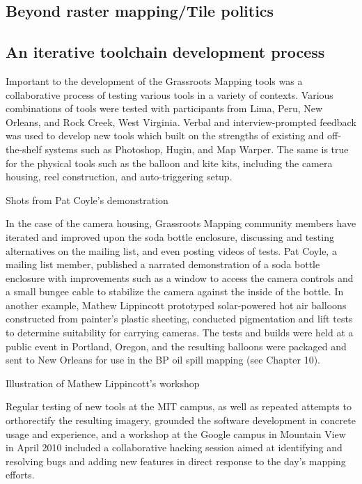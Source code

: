 \documentclass[11pt]{report}
\begin{document}
\subsection{Beyond raster mapping/Tile politics}


\subsection{An iterative toolchain development process}

Important to the development of the Grassroots Mapping tools was a collaborative process of testing various tools in a variety of contexts. Various combinations of tools were tested with participants from Lima, Peru, New Orleans, and Rock Creek, West Virginia. Verbal and interview-prompted feedback was used to develop new tools which built on the strengths of existing and off-the-shelf systems such as Photoshop, Hugin, and Map Warper. The same is true for the physical tools such as the balloon and kite kits, including the camera housing, reel construction, and auto-triggering setup. 

Shots from Pat Coyle's demonstration

In the case of the camera housing, Grassroots Mapping community members have iterated and improved upon the soda bottle enclosure, discussing and testing alternatives on the mailing list, and even posting videos of tests. Pat Coyle, a mailing list member, published a narrated demonstration of a soda bottle enclosure with improvements such as a window to access the camera controls and a small bungee cable to stabilize the camera against the inside of the bottle. In another example, Mathew Lippincott prototyped solar-powered hot air balloons constructed from painter's plastic sheeting, conducted pigmentation and lift tests to determine suitability for carrying cameras. The tests and builds were held at a public event in Portland, Oregon, and the resulting balloons were packaged and sent to New Orleans for use in the BP oil spill mapping (see Chapter 10). 

Illustration of Mathew Lippincott's workshop 

Regular testing of new tools at the MIT campus, as well as repeated attempts to orthorectify the resulting imagery, grounded the software development in concrete usage and experience, and a workshop at the Google campus in Mountain View in April 2010 included a collaborative hacking session aimed at identifying and resolving bugs and adding new features in direct response to the day's mapping efforts. 
\end{document}
